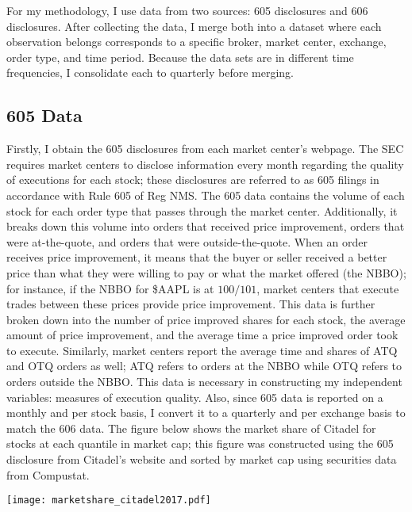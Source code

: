 \documentclass[12pt,a4paper]{article}
\begin{document}
	For my methodology, I use data from two sources: 605 disclosures and 606 disclosures. After collecting the data, I merge both into a dataset where each observation belongs corresponds to a specific broker, market center, exchange, order type, and time period. Because the data sets are in different time frequencies, I consolidate each to quarterly before merging. 
	
	\subsection{605 Data}
	
		Firstly, I obtain the 605 disclosures from each market center's webpage. The SEC requires market centers to disclose information every month regarding the quality of executions for each stock; these disclosures are referred to as 605 filings in accordance with Rule 605 of Reg NMS. The 605 data contains the volume of each stock for each order type that passes through the market center. Additionally, it breaks down this volume into orders that received price improvement, orders that were at-the-quote, and orders that were outside-the-quote. When an order receives price improvement, it means that the buyer or seller received a better price than what they were willing to pay or what the market offered (the NBBO); for instance, if the NBBO for \$AAPL is at $100/101$, market centers that execute trades between these prices provide price improvement. This data is further broken down into the number of price improved shares for each stock, the average amount of price improvement, and the average time a price improved order took to execute. Similarly, market centers report the average time and shares of ATQ and OTQ orders as well; ATQ refers to orders at the NBBO while OTQ refers to orders outside the NBBO. This data is necessary in constructing my independent variables: measures of execution quality. Also, since 605 data is reported on a monthly and per stock basis, I convert it to a quarterly and per exchange basis to match the 606 data. The figure below shows the market share of Citadel for stocks at each quantile in market cap; this figure was constructed using the 605 disclosure from Citadel's website and sorted by market cap using securities data from Compustat. 
		
		\begin{center}
			\texttt{[image: marketshare\_citadel2017.pdf]}
		\end{center}
			
\end{document}
